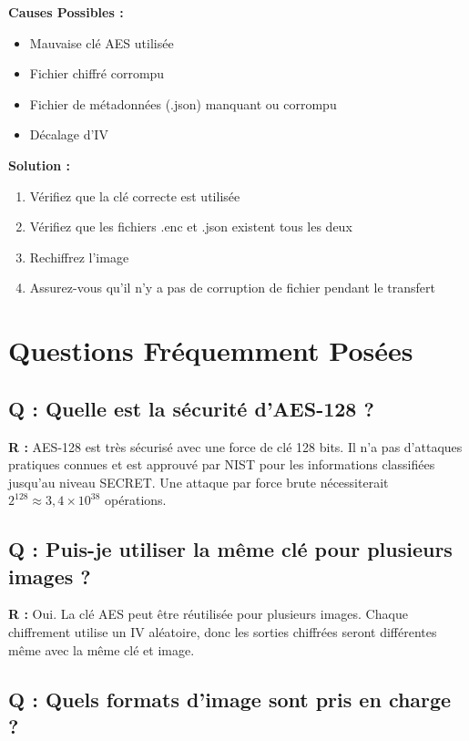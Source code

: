 \documentclass[12pt,a4paper]{report}
\begin{document}
\textbf{Causes Possibles :}
\begin{itemize}
    \item Mauvaise clé AES utilisée
    \item Fichier chiffré corrompu
    \item Fichier de métadonnées (.json) manquant ou corrompu
    \item Décalage d'IV
\end{itemize}

\textbf{Solution :}
\begin{enumerate}
    \item Vérifiez que la clé correcte est utilisée
    \item Vérifiez que les fichiers .enc et .json existent tous les deux
    \item Rechiffrez l'image
    \item Assurez-vous qu'il n'y a pas de corruption de fichier pendant le transfert
\end{enumerate}

\section{Questions Fréquemment Posées}

\subsection{Q : Quelle est la sécurité d'AES-128 ?}

\textbf{R :} AES-128 est très sécurisé avec une force de clé 128 bits. Il n'a pas d'attaques pratiques connues et est approuvé par NIST pour les informations classifiées jusqu'au niveau SECRET. Une attaque par force brute nécessiterait $2^{128} \approx 3,4 \times 10^{38}$ opérations.

\subsection{Q : Puis-je utiliser la même clé pour plusieurs images ?}

\textbf{R :} Oui. La clé AES peut être réutilisée pour plusieurs images. Chaque chiffrement utilise un IV aléatoire, donc les sorties chiffrées seront différentes même avec la même clé et image.

\subsection{Q : Quels formats d'image sont pris en charge ?}
\end{document}
